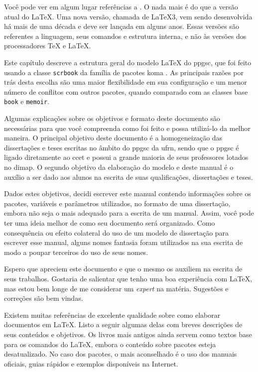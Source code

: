

Você pode ver em algum lugar referências a \LaTeXe{}. O \LaTeXe{} nada mais é do que a versão atual do \LaTeX{}. Uma nova versão, chamada de \LaTeX{}3, vem sendo desenvolvida há mais de uma década e deve ser lançada em alguns anos. Essas versões são referentes a linguagem, seus comandos e estrutura interna, e não às versões dos processadores \TeX{} e \LaTeX{}.

Este capítulo descreve a estrutura geral do modelo \LaTeX{} do \gls{ppgsc}, que foi feito usando a classe \texttt{scrbook} da família de pacotes \gls{koma} \parencite{koma}. As principais razões por trás desta escolha são uma maior flexibilidade em sua configuração e um menor número de conflitos com outros pacotes, quando comparado com as classes base \texttt{book} e \texttt{memoir}. 

Algumas explicações sobre os objetivos e formato deste documento são necessárias para que você compreenda como foi feito e possa utilizá-lo da melhor maneira. O principal objetivo deste documento é a homogeneização das dissertações e teses escritas no âmbito do \gls{ppgsc} da \gls{ufrn}, sendo que o \gls{ppgsc} é ligado diretamente ao \gls{ccet} e possui a grande maioria de seus professores lotados no \gls{dimap}. O segundo objetivo da elaboração do modelo e deste manual é o auxílio a ser dado aos alunos na escrita de suas qualificações, dissertações e teses.

Dados estes objetivos, decidi escrever este manual contendo informações sobre os pacotes, variáveis e parâmetros utilizados, no formato de uma dissertação, embora não seja o mais adequado para a escrita de um manual. Assim, você pode ter uma ideia melhor de como seu documento será organizado. Como consequência ou efeito colateral do uso de um modelo de dissertação para escrever esse manual, alguns nomes fantasia foram utilizados na sua escrita de modo a poupar terceiros do uso de seus nomes.

Espero que apreciem este documento e que o mesmo os auxiliem na escrita de seus trabalhos. Gostaria de salientar que tenho uma boa experiência com \LaTeX , mas estou bem longe de me considerar um \textit{expert} na matéria. Sugestões e correções são bem vindas.

Existem muitas referências de excelente qualidade sobre como elaborar documentos em \LaTeX . Listo a seguir algumas delas com breves descrições de seus conteúdos e objetivos. Os livros mais antigos ainda servem como textos base para os comandos do \LaTeX{}, embora o conteúdo sobre pacotes esteja desatualizado. No caso dos pacotes, o mais aconselhado é o uso dos manuais oficiais, guias rápidos e exemplos disponíveis na Internet.

